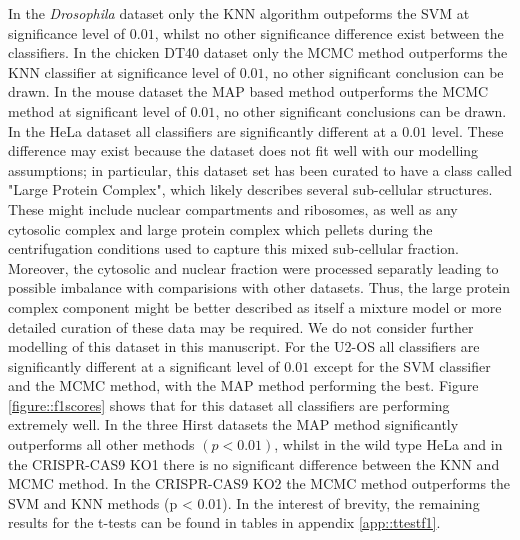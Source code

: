 \documentclass[12pt,english]{article}\usepackage[]{graphicx}\usepackage[]{color}
\begin{document}
In the \textit{Drosophila} dataset only the KNN algorithm outpeforms
the SVM at significance level of $0.01$, whilst no other significance
difference exist between the classifiers. In the chicken DT40 dataset
only the MCMC method outperforms the KNN classifier at significance
level of $0.01$, no other significant conclusion can be drawn. In the
mouse dataset the MAP based method outperforms the MCMC method at
significant level of $0.01$, no other significant conclusions can be
drawn. In the HeLa dataset all classifiers are significantly different
at a $0.01$ level. These difference may exist because the dataset does
not fit well with our modelling assumptions; in particular, this
dataset set has been curated to have a class called "Large Protein
Complex", which likely describes several sub-cellular
structures. These might include nuclear compartments and ribosomes, as
well as any cytosolic complex and large protein complex which pellets
during the centrifugation conditions used to capture this mixed
sub-cellular fraction. Moreover, the cytosolic and nuclear fraction
were processed separatly leading to possible imbalance with
comparisions with other datasets. Thus, the large protein complex
component might be better described as itself a mixture model or more
detailed curation of these data may be required. We do not consider
further modelling of this dataset in this manuscript. For the U2-OS
all classifiers are significantly different at a significant level of
$0.01$ except for the SVM classifier and the MCMC method, with the MAP
method performing the best. Figure \ref{figure::f1scores} shows that
for this dataset all classifiers are performing extremely well. In the
three Hirst datasets the MAP method significantly outperforms all
other methods $(p < 0.01)$, whilst in the wild type HeLa and in the
CRISPR-CAS9 KO1 there is no significant difference between the KNN
and MCMC method. In the CRISPR-CAS9 KO2 the MCMC method outperforms
the SVM and KNN methods (p < 0.01). In the interest of brevity, the
remaining results for the t-tests can be found in tables in appendix
\ref{app::ttestf1}.
\end{document}
